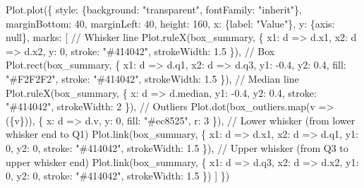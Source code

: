 \documentclass[
  letterpaper,
  DIV=11,
  numbers=noendperiod]{scrartcl}
\newenvironment{Shaded}{\begin{snugshade}}{\end{snugshade}}
\newcommand{\NormalTok}[1]{\textcolor[rgb]{0.00,0.23,0.31}{#1}}
\begin{document}
\begin{Shaded}
\begin{Highlighting}[]
\NormalTok{Plot.plot(\{}
\NormalTok{  style: \{background: "transparent", fontFamily: "inherit"\},}
\NormalTok{  marginBottom: 40,}
\NormalTok{  marginLeft: 40,}
\NormalTok{  height: 160,}
\NormalTok{  x: \{label: "Value"\},}
\NormalTok{  y: \{axis: null\},}
\NormalTok{  marks: [}
\NormalTok{    // Whisker line}
\NormalTok{    Plot.ruleX(box\_summary, \{}
\NormalTok{      x1: d =\textgreater{} d.x1,}
\NormalTok{      x2: d =\textgreater{} d.x2,}
\NormalTok{      y: 0,}
\NormalTok{      stroke: "\#414042",}
\NormalTok{      strokeWidth: 1.5}
\NormalTok{    \}),}
\NormalTok{    // Box}
\NormalTok{    Plot.rect(box\_summary, \{}
\NormalTok{      x1: d =\textgreater{} d.q1,}
\NormalTok{      x2: d =\textgreater{} d.q3,}
\NormalTok{      y1: {-}0.4,}
\NormalTok{      y2: 0.4,}
\NormalTok{      fill: "\#F2F2F2",}
\NormalTok{      stroke: "\#414042",}
\NormalTok{      strokeWidth: 1.5}
\NormalTok{    \}),}
\NormalTok{    // Median line}
\NormalTok{    Plot.ruleX(box\_summary, \{}
\NormalTok{      x: d =\textgreater{} d.median,}
\NormalTok{      y1: {-}0.4,}
\NormalTok{      y2: 0.4,}
\NormalTok{      stroke: "\#414042",}
\NormalTok{      strokeWidth: 2}
\NormalTok{    \}),}
\NormalTok{    // Outliers}
\NormalTok{    Plot.dot(box\_outliers.map(v =\textgreater{} (\{v\})), \{}
\NormalTok{      x: d =\textgreater{} d.v,}
\NormalTok{      y: 0,}
\NormalTok{      fill: "\#ec8525",}
\NormalTok{      r: 3}
\NormalTok{    \}),}
\NormalTok{    // Lower whisker (from lower whisker end to Q1)}
\NormalTok{Plot.link(box\_summary, \{}
\NormalTok{  x1: d =\textgreater{} d.x1,}
\NormalTok{  x2: d =\textgreater{} d.q1,}
\NormalTok{  y1: 0,}
\NormalTok{  y2: 0,}
\NormalTok{  stroke: "\#414042",}
\NormalTok{  strokeWidth: 1.5}
\NormalTok{\}),}
\NormalTok{// Upper whisker (from Q3 to upper whisker end)}
\NormalTok{Plot.link(box\_summary, \{}
\NormalTok{  x1: d =\textgreater{} d.q3,}
\NormalTok{  x2: d =\textgreater{} d.x2,}
\NormalTok{  y1: 0,}
\NormalTok{  y2: 0,}
\NormalTok{  stroke: "\#414042",}
\NormalTok{  strokeWidth: 1.5}
\NormalTok{\})}
\NormalTok{  ]}
\NormalTok{\})}
\end{Highlighting}
\end{Shaded}

\begin{Shaded}
\end{Shaded}
\end{document}
